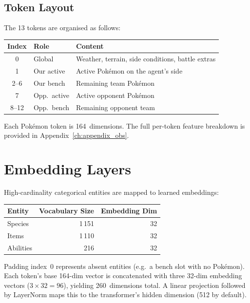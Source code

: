 \subsection{Token Layout}

The 13 tokens are organised as follows:

\begin{center}
\small
\begin{tabularx}{0.7\textwidth}{c l l}
  \toprule
  \textbf{Index} & \textbf{Role} & \textbf{Content} \\
  \midrule
  0        & Global      & Weather, terrain, side conditions, battle extras \\
  1        & Our active  & Active Pok\'{e}mon on the agent's side \\
  2--6     & Our bench   & Remaining team Pok\'{e}mon \\
  7        & Opp.\ active & Active opponent Pok\'{e}mon \\
  8--12    & Opp.\ bench  & Remaining opponent team \\
  \bottomrule
\end{tabularx}
\end{center}

Each Pok\'{e}mon token is 164~dimensions.  The full per-token feature
breakdown is provided in Appendix~\ref{ch:appendix_obs}.

\section{Embedding Layers}

High-cardinality categorical entities are mapped to learned embeddings:

\begin{center}
\small
\begin{tabularx}{0.7\textwidth}{l r r}
  \toprule
  \textbf{Entity} & \textbf{Vocabulary Size} & \textbf{Embedding Dim} \\
  \midrule
  Species   & 1\,151 & 32 \\
  Items     & 1\,110 & 32 \\
  Abilities & 216    & 32 \\
  \bottomrule
\end{tabularx}
\end{center}

Padding index~0 represents absent entities (e.g.\ a bench slot with no
Pok\'{e}mon).  Each token's base 164-dim vector is concatenated with three
32-dim embedding vectors ($3 \times 32 = 96$), yielding 260~dimensions total.
A linear projection followed by LayerNorm maps this to the transformer's hidden
dimension (512 by default).

